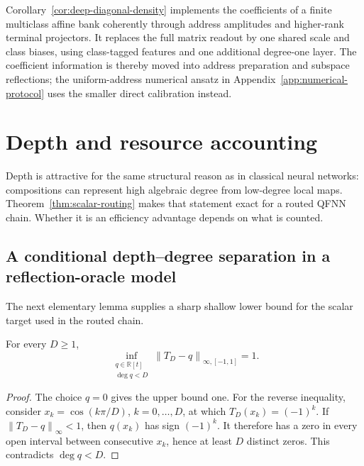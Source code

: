 \documentclass[pdflatex,sn-mathphys,NameDate,iicol]{sn-jnl}
\newcommand{\R}{\mathbb{R}}
\newcommand{\norm}[1]{\left\lVert #1\right\rVert}
\begin{document}
Corollary~\ref{cor:deep-diagonal-density} implements the coefficients of a
finite multiclass affine bank coherently through address amplitudes and
higher-rank terminal projectors. It replaces the full matrix readout by one
shared scale and class biases, using class-tagged features and one additional
degree-one layer. The coefficient information is thereby moved into address
preparation and subspace reflections; the uniform-address numerical ansatz in
Appendix~\ref{app:numerical-protocol} uses the smaller direct calibration
instead.

\section{Depth and resource accounting}
\label{sec:resources}
\label{sec:depth}

Depth is attractive for the same structural reason as in classical neural
networks: compositions can represent high algebraic degree from low-degree
local maps. Theorem~\ref{thm:scalar-routing} makes that statement exact for
a routed QFNN chain. Whether it is an efficiency advantage depends on what
is counted.

\subsection{A conditional depth--degree separation in a reflection-oracle model}

The next elementary lemma supplies a sharp shallow lower bound for the
scalar target used in the routed chain.

\begin{lemma}
\label{lem:cheb-lower-barrier}
For every $D\ge1$,
\begin{equation}
 \inf_{\substack{q\in\R[t]\\\deg q<D}}
 \norm{T_D-q}_{\infty,[-1,1]}=1.
 \label{eq:cheb-lower-barrier}
\end{equation}
\end{lemma}

\begin{proof}
The choice $q=0$ gives the upper bound one. For the reverse inequality,
consider $x_k=\cos(k\pi/D)$, $k=0,\ldots,D$, at which
$T_D(x_k)=(-1)^k$. If $\norm{T_D-q}_\infty<1$, then $q(x_k)$ has sign
$(-1)^k$. It therefore has a zero in every open interval between
consecutive $x_k$, hence at least $D$ distinct zeros. This contradicts
$\deg q<D$.
\end{proof}
\end{document}
